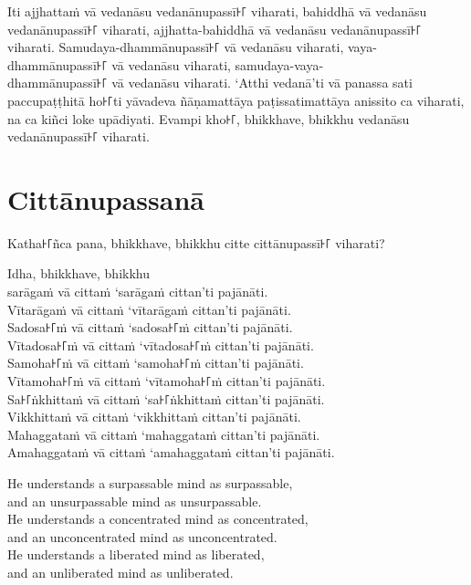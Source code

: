 \paliPage

Iti ajjhattaṁ vā vedanāsu vedanānupassī꜔꜒ viharati, bahiddhā vā vedanāsu
vedanānupassī꜔꜒ viharati, ajjhatta-bahiddhā vā vedanāsu vedanānupassī꜔꜒ viharati.
Samudaya-dhammānupassī꜔꜒ vā vedanāsu viharati, vaya-dhammānupassī꜔꜒ vā vedanāsu
viharati, samudaya-vaya-\\
dhammānupassī꜔꜒ vā vedanāsu viharati. ‘Atthi vedanā’ti vā panassa sati
paccupaṭṭhitā ho꜔꜒ti yāvadeva ñāṇamattāya paṭissatimattāya anissito ca viharati,
na ca kiñci loke upādiyati. Evampi kho꜔꜒, bhikkhave, bhikkhu vedanāsu
vedanānupassī꜔꜒ viharati.


\chapter*{Cittānupassanā}

Katha꜔꜒ñca pana, bhikkhave, bhikkhu citte cittānupassī꜔꜒ viharati?

Idha, bhikkhave, bhikkhu\\
sarāgaṁ vā cittaṁ ‘sarāgaṁ cittan’ti pajānāti.\\
Vītarāgaṁ vā cittaṁ ‘vītarāgaṁ cittan’ti pajānāti.\\
Sadosa꜔꜒ṁ vā cittaṁ ‘sadosa꜔꜒ṁ cittan’ti pajānāti.\\
Vītadosa꜔꜒ṁ vā cittaṁ ‘vītadosa꜔꜒ṁ cittan’ti pajānāti.\\
Samoha꜔꜒ṁ vā cittaṁ ‘samoha꜔꜒ṁ cittan’ti pajānāti.\\
Vītamoha꜔꜒ṁ vā cittaṁ ‘vītamoha꜔꜒ṁ cittan’ti pajānāti.\\
Sa꜔꜒ṅkhittaṁ vā cittaṁ ‘sa꜔꜒ṅkhittaṁ cittan’ti pajānāti.\\
Vikkhittaṁ vā cittaṁ ‘vikkhittaṁ cittan’ti pajānāti.\\
Mahaggataṁ vā cittaṁ ‘mahaggataṁ cittan’ti pajānāti.\\
Amahaggataṁ vā cittaṁ ‘amahaggataṁ cittan’ti pajānāti.

\englishPage

He understands a surpassable mind as surpassable,\\
and an unsurpassable mind as unsurpassable.\\
He understands a concentrated mind as concentrated,\\
and an unconcentrated mind as unconcentrated.\\
He understands a liberated mind as liberated,\\
and an unliberated mind as unliberated.

